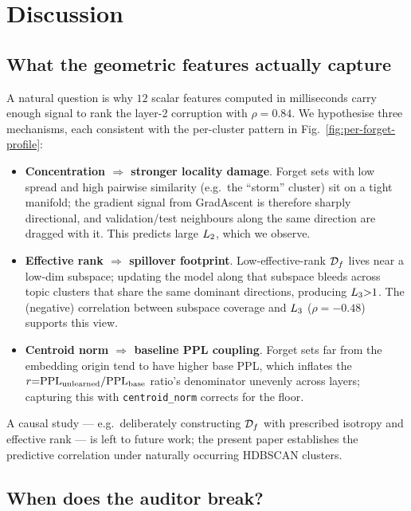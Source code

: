 \section{Discussion}
\label{sec:discussion}

\subsection{What the geometric features actually capture}
\label{sec:why-it-works}

A natural question is why $12$ scalar features computed in milliseconds carry enough signal to rank the layer-2 corruption with $\rho{=}0.84$. We hypothesise three mechanisms, each consistent with the per-cluster pattern in Fig.~\ref{fig:per-forget-profile}:
\begin{itemize}
    \setlength\itemsep{0.15em}
    \item \textbf{Concentration $\Rightarrow$ stronger locality damage}. Forget sets with low spread and high pairwise similarity (e.g.\ the ``storm'' cluster) sit on a tight manifold; the gradient signal from GradAscent is therefore sharply directional, and validation/test neighbours along the same direction are dragged with it. This predicts large $L_2$, which we observe.
    \item \textbf{Effective rank $\Rightarrow$ spillover footprint}. Low-effective-rank $\mathcal{D}_f$ lives near a low-dim subspace; updating the model along that subspace bleeds across topic clusters that share the same dominant directions, producing $L_3{>}1$. The (negative) correlation between subspace coverage and $L_3$ ($\rho{=}{-}0.48$) supports this view.
    \item \textbf{Centroid norm $\Rightarrow$ baseline PPL coupling}. Forget sets far from the embedding origin tend to have higher base PPL, which inflates the $r{=}\mathrm{PPL}_{\text{unlearned}}/\mathrm{PPL}_{\text{base}}$ ratio's denominator unevenly across layers; capturing this with \texttt{centroid\_norm} corrects for the floor.
\end{itemize}
A causal study --- e.g.\ deliberately constructing $\mathcal{D}_f$ with prescribed isotropy and effective rank --- is left to future work; the present paper establishes the predictive correlation under naturally occurring HDBSCAN clusters.

\subsection{When does the auditor break?}
\label{sec:failure}

